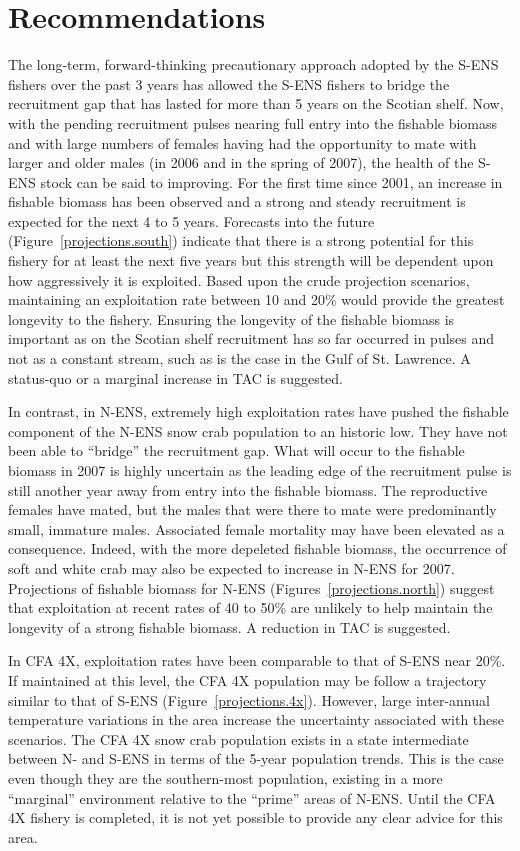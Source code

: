 \documentclass[11pt]{article}
\begin{document}
\section{Recommendations}

The long-term, forward-thinking precautionary approach adopted by the S-ENS fishers over the past 3 years has allowed the S-ENS fishers to bridge the recruitment gap that has lasted for more than 5 years on the Scotian shelf. Now, with the pending recruitment pulses nearing full entry into the fishable biomass and with large numbers of females having had the opportunity to mate with larger and older males (in 2006 and in the spring of 2007), the health of the S-ENS stock can be said to improving. For the first time since 2001, an increase in fishable biomass has been observed and a strong and steady recruitment is expected for the next 4 to 5 years. Forecasts into the future (Figure~\ref{projections.south}) indicate that there is a strong potential for this fishery for at least the next five years but this strength will be dependent upon how aggressively it is exploited. Based upon the crude projection scenarios, maintaining an exploitation rate between 10 and 20\% would provide the greatest longevity to the fishery. Ensuring the longevity of the fishable biomass is important as on the Scotian shelf recruitment has so far occurred in pulses and not as a constant stream, such as is the case in the Gulf of St. Lawrence. A status-quo or a marginal increase in TAC is suggested.

In contrast, in N-ENS, extremely high exploitation rates have pushed the fishable component of the N-ENS snow crab population to an historic low. They have not been able to ``bridge'' the recruitment gap. What will occur to the fishable biomass in 2007 is highly uncertain as the leading edge of the recruitment pulse is still another year away from entry into the fishable biomass. The reproductive females have mated, but the males that were there to mate were predominantly small, immature males. Associated female mortality may have been elevated as a consequence. Indeed, with the more depeleted fishable biomass, the occurrence of soft and white crab may also be expected to increase in N-ENS for 2007. Projections of fishable biomass for N-ENS (Figures~\ref{projections.north}) suggest that exploitation at recent rates of 40 to 50\% are unlikely to help maintain the longevity of a strong fishable biomass. A reduction in TAC is suggested.

In CFA 4X, exploitation rates have been comparable to that of S-ENS near 20\%. If maintained at this level, the CFA 4X population may be follow a trajectory similar to that of S-ENS (Figure~\ref{projections.4x}). However, large inter-annual temperature variations in the area increase the uncertainty associated with these scenarios. The CFA 4X snow crab population exists in a state intermediate between N- and S-ENS in terms of the 5-year population trends. This is the case even though they are the southern-most population, existing in a more ``marginal'' environment relative to the ``prime'' areas of N-ENS. Until the CFA 4X fishery is completed, it is not yet possible to provide any clear advice for this area.
\end{document}
